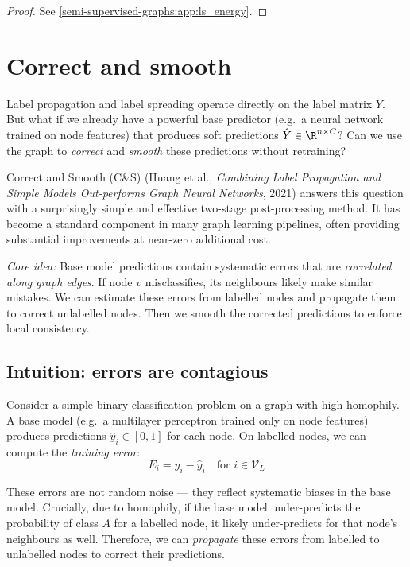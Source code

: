 \begin{notechapter}
\begin{proof}
See \cref{semi-supervised-graphs:app:ls_energy}.
\end{proof}

\section{Correct and smooth}
\label{semi-supervised-graphs:sec:cs}

Label propagation and label spreading operate directly on the label matrix
$Y$. But what if we already have a powerful base predictor (e.g.\ a neural
network trained on node features) that produces soft predictions
$\hat{Y} \in \R^{n \times C}$? Can we use the graph to \emph{correct} and
\emph{smooth} these predictions without retraining?

Correct and Smooth (C\&S) (Huang et al., \emph{Combining Label Propagation and Simple Models Out-performs Graph Neural Networks}, 2021) answers this question with a
surprisingly simple and effective two-stage post-processing method. It has
become a standard component in many graph learning pipelines, often providing
substantial improvements at near-zero additional cost.

\begin{intuition}
\emph{Core idea:} Base model predictions contain systematic errors that are
\emph{correlated along graph edges}. If node $v$ misclassifies, its neighbours
likely make similar mistakes. We can estimate these errors from labelled nodes
and propagate them to correct unlabelled nodes. Then we smooth the corrected
predictions to enforce local consistency.
\end{intuition}

\subsection{Intuition: errors are contagious}

Consider a simple binary classification problem on a graph with high homophily.
A base model (e.g.\ a multilayer perceptron trained only on node features)
produces predictions $\hat{y}_i \in [0,1]$ for each node. On labelled nodes, we
can compute the \emph{training error}:
\begin{equation}
E_i = y_i - \hat{y}_i \quad \text{for } i \in \mathcal{V}_L
\end{equation}

These errors are not random noise --- they reflect systematic biases in the base
model. Crucially, due to homophily, if the base model under-predicts the
probability of class $A$ for a labelled node, it likely under-predicts for that
node's neighbours as well. Therefore, we can \emph{propagate} these errors
from labelled to unlabelled nodes to correct their predictions.


\end{notechapter}
